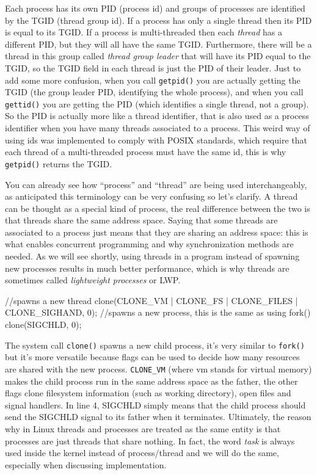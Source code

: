\documentclass[10pt]{book}
\begin{document}
Each process has its own PID (process id) and groups of processes are identified by the TGID (thread group id). If a process has only a single thread then its PID is equal to its TGID. If a process is multi-threaded then each \textit{thread} has a different PID, but they will all have the same TGID. Furthermore, there will be a thread in this group called \textit{thread group leader} that will have its PID equal to the TGID, so the TGID field in each thread is just the PID of their leader. Just to add some more confusion, when you call \verb|getpid()| you are actually getting the TGID (the group leader PID, identifying the whole process), and when you call \verb|gettid()| you are getting the PID (which identifies a single thread, not a group). So the PID is actually more like a thread identifier, that is also used as a process identifier when you have many threads associated to a process. This weird way of using ids was implemented to comply with POSIX standards, which require that each thread of a multi-threaded process must have the same id, this is why \verb|getpid()| returns the TGID.

You can already see how ``process'' and ``thread'' are being used interchangeably, as anticipated this terminology can be very confusing so let's clarify. A thread can be thought as a special kind of process, the real difference between the two is that threads share the same address space. Saying that some threads are associated to a process just means that they are sharing an address space: this is what enables concurrent programming and why synchronization methods are needed. As we will see shortly, using threads in a program instead of spawning new processes results in much better performance, which is why threads are sometimes called \textit{lightweight processes} or LWP. %
\begin{code}
//spawns a new thread
clone(CLONE_VM | CLONE_FS | CLONE_FILES | CLONE_SIGHAND, 0); 
//spawns a new process, this is the same as using fork()
clone(SIGCHLD, 0); 
\end{code}
The system call \verb|clone()| spawns a new child process, it's very similar to \verb|fork()| but it's more versatile because flags can be used to decide how many resources are shared with the new process. \verb|CLONE_VM| (where vm stands for virtual memory) makes the child process run in the same address space as the father, the other flags clone filesystem information (such as working directory), open files and signal handlers. In line 4, SIGCHLD simply means that the child process should send the SIGCHLD signal to its father when it terminates. Ultimately, the reason why in Linux threads and processes are treated as the same entity is that processes are just threads that share nothing. In fact, the word \textit{task} is always used inside the kernel instead of process/thread and we will do the same, especially when discussing implementation.
\end{document}
